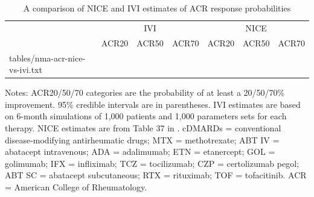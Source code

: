 \documentclass[11pt,final,fleqn]{article}\usepackage[]{graphicx}\usepackage[]{color}
\makeatletter
\theoremstyle{plain}
\newcommand*\ExpandableInput[1]{\@@input#1 }
\makeatother
\begin{document}
\begin{appendices}
\begin{table}[!ht]
\begin{center}
\scriptsize
\begin{threeparttable}
\caption{A comparison of NICE and IVI estimates of ACR response probabilities} \label{tbl:nma-acr-nice-vs-ivi}
\begin{tabularx}{\textwidth}{@{\extracolsep{\fill}}lrrrrrr}
\hline
\multicolumn{1}{c}{} & \multicolumn{3}{c}{IVI} & \multicolumn{3}{c}{NICE}\\
\cmidrule(lr){2-4} \cmidrule(lr){5-7}
\multicolumn{1}{l}{} & \multicolumn{1}{c}{ACR20} & \multicolumn{1}{c}{ACR50} & \multicolumn{1}{c}{ACR70} & \multicolumn{1}{c}{ACR20} & \multicolumn{1}{c}{ACR50} & \multicolumn{1}{c}{ACR70}\\
\hline
\ExpandableInput{tables/nma-acr-nice-vs-ivi.txt}
\hline
\end{tabularx}
\scriptsize
Notes: ACR20/50/70 categories are the probability of at least a 20/50/70\% improvement. 95\% credible intervals are in parentheses. IVI estimates are based on 6-month simulations of 1,000 patients and 1,000 parameters sets for each therapy. NICE estimates are from Table 37 in \citet{stevenson2017cost}. cDMARDs = conventional disease-modifying antirheumatic drugs; MTX = methotrexate; ABT IV = abatacept intravenous; ADA = adalimumab; ETN = etanercept; GOL = golimumab; IFX = infliximab; TCZ = tocilizumab; CZP = certolizumab pegol; ABT SC = abatacept subcutaneous; RTX = rituximab; TOF = tofacitinib. ACR = American College of Rheumatology.
\end{threeparttable}
\end{center}
\end{table}

\end{appendices}


\end{document}
